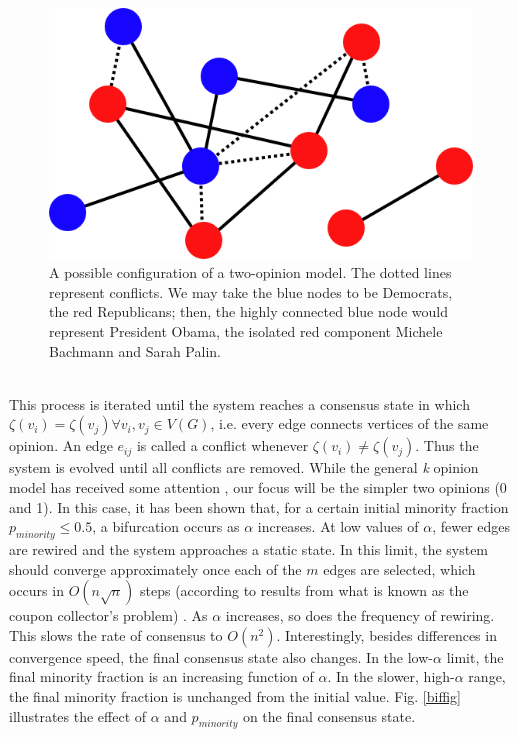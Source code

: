 \documentclass[11pt]{article}
\begin{document}
\begin{figure}[h!]
  \centering
  \includegraphics[width=.5\linewidth]{votingModel}
  \caption{A possible configuration of a two-opinion model. The dotted lines represent conflicts. We may take the blue nodes to be Democrats, the red Republicans; then, the highly connected blue node would represent President Obama, the isolated red component Michele Bachmann and Sarah Palin.}
  \label{fig:graphA}
\end{figure}
\\
This process is iterated until the system reaches a consensus state in which $\zeta(v_{i}) = \zeta(v_{j}) \forall v_{i}, v_{j} \in V(G)$, i.e. every edge connects vertices of the same opinion. An edge $e_{ij}$ is called a conflict whenever $\zeta(v_{i}) \ne \zeta(v_{j})$. Thus the system is evolved until all conflicts are removed. While the general \textit{k} opinion model has received some attention \cite{durretts preprint?}, our focus will be the simpler two opinions (0 and 1). In this case, it has been shown that, for a certain initial minority fraction $p_{minority} \le 0.5$, a bifurcation occurs as $\alpha$ increases. At low values of $\alpha$, fewer edges are rewired and the system approaches a static state. In this limit, the system should converge approximately once each of the $m$ edges are selected, which occurs in $O(n\sqrt{n})$ steps (according to results from what is known as the coupon collector's problem) \cite{durrett}. As $\alpha$ increases, so does the frequency of rewiring. This slows the rate of consensus to $O(n^{2})$. Interestingly, besides differences in convergence speed, the final consensus state also changes. In the low-$\alpha$ limit, the final minority fraction is an increasing function of $\alpha$. In the slower, high-$\alpha$ range, the final minority fraction is unchanged from the initial value. Fig. \ref{biffig} illustrates the effect of $\alpha$ and $p_{minority}$ on the final consensus state.\vspace{1mm}\\
\end{document}
